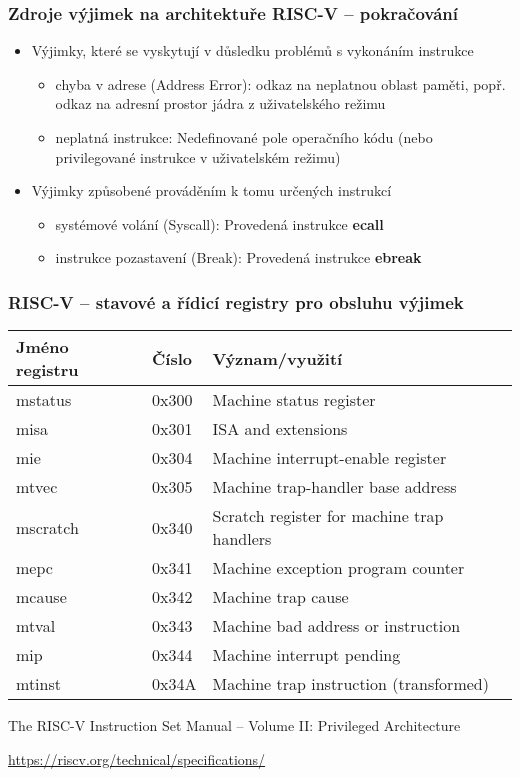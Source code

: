 \documentclass{beamer}
\begin{document}
\begin{frame}
\frametitle{Zdroje výjimek na architektuře RISC-V -- pokračování}

\begin{itemize}
 \item Výjimky, které se vyskytují v důsledku problémů s vykonáním instrukce
 \begin{itemize}
  \item chyba v adrese (Address Error): odkaz na neplatnou oblast paměti, popř.
odkaz na adresní prostor jádra z uživatelského režimu
 \item neplatná instrukce: Nedefinované pole operačního kódu (nebo privilegované
instrukce v uživatelském režimu)
 \end{itemize}
 \item Výjimky způsobené prováděním k tomu určených instrukcí
 \begin{itemize}
  \item systémové volání (Syscall): Provedená instrukce \textbf{ecall}
  \item instrukce pozastavení (Break): Provedená instrukce \textbf{ebreak}
 \end{itemize}
\end{itemize}
\end{frame}

\begin{frame}
\frametitle{RISC-V -- stavové a řídicí registry pro obsluhu výjimek}

\begin{tabular}{|l|l|l|}  \hline
Jméno registru & Číslo & Význam/využití \\\hline
mstatus & 0x300 & Machine status register \\\hline
misa & 0x301 & ISA and extensions \\\hline
mie & 0x304 & Machine interrupt-enable register \\\hline
mtvec & 0x305 & Machine trap-handler base address \\\hline
mscratch & 0x340 &Scratch register for machine trap handlers \\\hline
mepc & 0x341 & Machine exception program counter \\\hline
mcause & 0x342 & Machine trap cause \\\hline
mtval &0x343 & Machine bad address or instruction \\\hline
mip & 0x344 & Machine interrupt pending \\\hline
mtinst & 0x34A & Machine trap instruction (transformed) \\\hline
\end{tabular} 

\vspace{3mm}

The RISC-V Instruction Set Manual – Volume II: Privileged Architecture

\url{https://riscv.org/technical/specifications/}
\end{frame}
\end{document}
